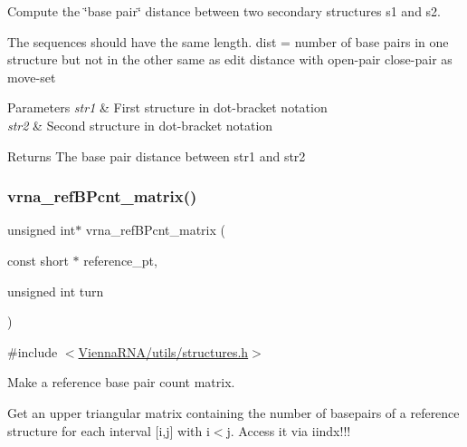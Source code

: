 Compute the \char`\"{}base pair\char`\"{} distance between two secondary structures s1 and s2. 

The sequences should have the same length. dist = number of base pairs in one structure but not in the other same as edit distance with open-\/pair close-\/pair as move-\/set


\begin{DoxyParams}{Parameters}
{\em str1} & First structure in dot-\/bracket notation \\
\hline
{\em str2} & Second structure in dot-\/bracket notation \\
\hline
\end{DoxyParams}
\begin{DoxyReturn}{Returns}
The base pair distance between str1 and str2 
\end{DoxyReturn}
\mbox{\label{group__struct__utils_gab4c2a00c99ce1d612ffa5bde114eb96d}} 
\subsubsection{\texorpdfstring{vrna\+\_\+ref\+B\+Pcnt\+\_\+matrix()}{vrna\_refBPcnt\_matrix()}}
{\footnotesize\ttfamily unsigned int$\ast$ vrna\+\_\+ref\+B\+Pcnt\+\_\+matrix (\begin{DoxyParamCaption}\item[{const short $\ast$}]{reference\+\_\+pt,  }\item[{unsigned int}]{turn }\end{DoxyParamCaption})}



{\ttfamily \#include $<$\hyperlink{utils_2structures_8h}{Vienna\+R\+N\+A/utils/structures.\+h}$>$}



Make a reference base pair count matrix. 

Get an upper triangular matrix containing the number of basepairs of a reference structure for each interval \mbox{[}i,j\mbox{]} with i$<$j. Access it via iindx!!! \mbox{\label{group__struct__utils_ga5a27bd058183170afd4716f5b8ff511a}} 
